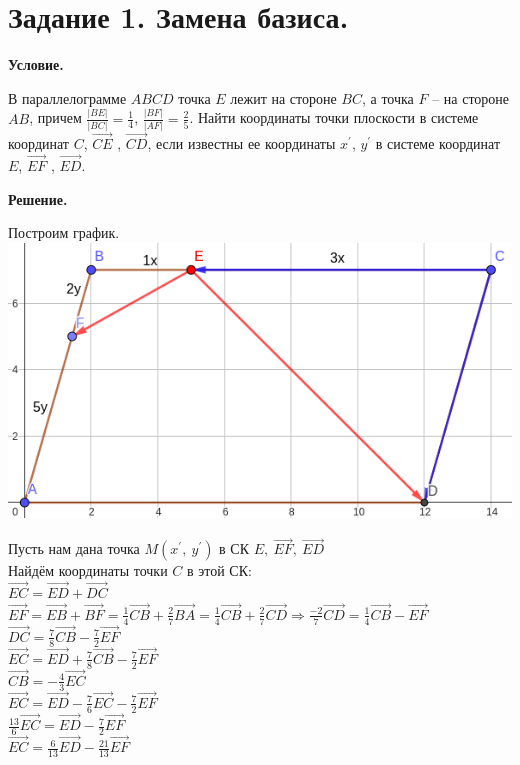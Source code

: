 \section{Задание 1. Замена базиса.}

\textbf{Условие.}

В параллелограмме $ABCD$ точка $E$ лежит на стороне $BC$, а точка $F$ – на стороне $AB$, причем $\displaystyle \frac{|BE|}{|BC|} = \frac{1}{4}$, $\displaystyle \frac{|BF|}{|AF|} = \frac{2}{5}$.
Найти координаты точки плоскости в системе координат $C$, $\overrightarrow{CE}$ , $\overrightarrow{CD}$,
если известны ее координаты $x^\prime$, $y^\prime$ в системе координат $E$, $\overrightarrow{EF}$ , $\overrightarrow{ED}$.
\vspace{10mm}

\textbf{Решение.}

Построим график. \\
\includegraphics[width=0.9\linewidth]{images/1_grafik.png}

Пусть нам дана точка $M(x^\prime,~y^\prime)$ в СК $E,~\overrightarrow{EF},~\overrightarrow{ED}$ \\
Найдём координаты точки $C$ в этой СК:  \\

	$\overrightarrow{EC} = \overrightarrow{ED} + \overrightarrow{DC} $ \\
	$\overrightarrow{EF} = \overrightarrow{EB} + \overrightarrow{BF} = \frac{1}{4} \overrightarrow{CB} + \frac{2}{7} \overrightarrow{BA} = \frac{1}{4} \overrightarrow{CB} + \frac{2}{7} \overrightarrow{CD} \Longrightarrow \frac{-2}{7} \overrightarrow{CD} = \frac{1}{4} \overrightarrow{CB} - \overrightarrow{EF} $ \\ 
	$\overrightarrow{DC} = \frac{7}{8} \overrightarrow{CB} - \frac{7}{2} \overrightarrow{EF} $ \\ 
	$\overrightarrow{EC} = \overrightarrow{ED} + \frac{7}{8} \overrightarrow{CB} - \frac{7}{2} \overrightarrow{EF} $ \\
	$\overrightarrow{CB} = -\frac{4}{3} \overrightarrow{EC} $ \\ 
	$\overrightarrow{EC} = \overrightarrow{ED} - \frac{7}{6} \overrightarrow{EC} - \frac{7}{2} \overrightarrow{EF} $ \\
	$\frac{13}{6} \overrightarrow{EC} = \overrightarrow{ED} - \frac{7}{2} \overrightarrow{EF} $ \\
	$\overrightarrow{EC} = \frac{6}{13} \overrightarrow{ED} - \frac{21}{13} \overrightarrow{EF} $ \\

